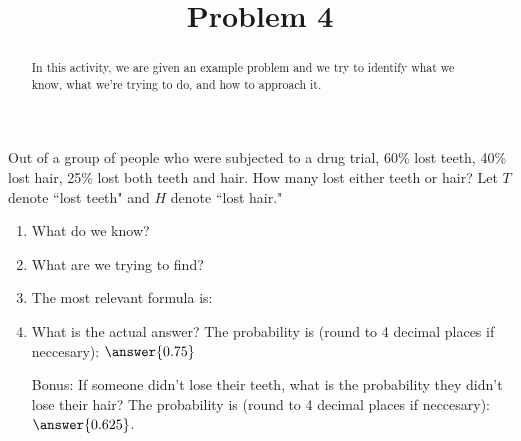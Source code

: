 \documentclass{ximera}
\title{Problem 4}
\begin{document}
      
\begin{abstract}
      
In this activity, we are given an example problem and we try to identify what we know, what we're trying to do, and how to approach it.
      
\end{abstract}
      
\maketitle
      
 
Out of a group of people who were subjected to a drug trial, 60\% lost teeth, 40\% lost hair, 25\% lost both teeth and hair.  How many lost either teeth or hair?  Let $T$ denote ``lost teeth" and $H$ denote ``lost hair."

 
 \begin{enumerate}
\item What do we know?

\begin{selectAll}
\end{selectAll}

\item What are we trying to find?

\begin{multipleChoice}




\end{multipleChoice}

\item The most relevant formula is:

\begin{multipleChoice}
\end{multipleChoice}

\item What is the actual answer?  The probability is (round to 4 decimal places if neccesary): $\answer{0.75}$

\item[Bonus:] If someone didn't lose their teeth, what is the probability they didn't lose their hair?  The probability is (round to 4 decimal places if neccesary): $\answer{0.625}$.

\end{enumerate}

 
 
 
 
      
\end{document}
